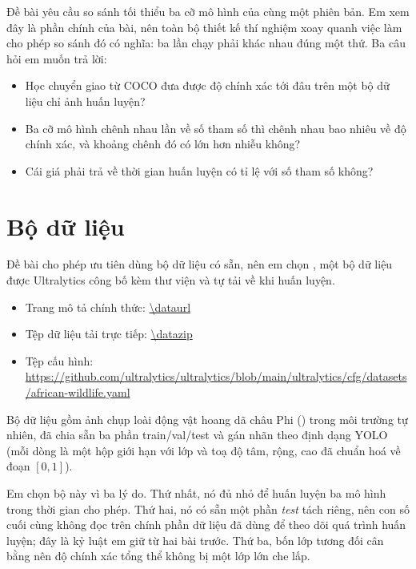 \documentclass[11pt,a4paper]{article}
\begin{document}
Đề bài yêu cầu so sánh tối thiểu ba cỡ mô hình của cùng một phiên bản. Em xem đây là phần chính
của bài, nên toàn bộ thiết kế thí nghiệm xoay quanh việc làm cho phép so sánh đó có nghĩa: ba lần
chạy phải khác nhau đúng một thứ. Ba câu hỏi em muốn trả lời:

\begin{itemize}
  \item Học chuyển giao từ COCO đưa được độ chính xác tới đâu trên một bộ dữ liệu chỉ
        \ntrain{} ảnh huấn luyện?
  \item Ba cỡ mô hình chênh nhau \paramratio{} lần về số tham số thì chênh nhau bao nhiêu về độ
        chính xác, và khoảng chênh đó có lớn hơn nhiễu không?
  \item Cái giá phải trả về thời gian huấn luyện có tỉ lệ với số tham số không?
\end{itemize}

\section{Bộ dữ liệu}

Đề bài cho phép ưu tiên dùng bộ dữ liệu có sẵn, nên em chọn \textbf{\dataname{}}, một bộ dữ liệu
được Ultralytics công bố kèm thư viện và tự tải về khi huấn luyện.

\begin{itemize}
  \item Trang mô tả chính thức: \url{\dataurl}
  \item Tệp dữ liệu tải trực tiếp: \url{\datazip}
  \item Tệp cấu hình: \url{https://github.com/ultralytics/ultralytics/blob/main/ultralytics/cfg/datasets/african-wildlife.yaml}
\end{itemize}

Bộ dữ liệu gồm ảnh chụp \nclasses{} loài động vật hoang dã châu Phi (\classlist{}) trong môi
trường tự nhiên, đã chia sẵn ba phần train/val/test và gán nhãn theo định dạng YOLO (mỗi dòng là
một hộp giới hạn với lớp và toạ độ tâm, rộng, cao đã chuẩn hoá về đoạn $[0,1]$).

Em chọn bộ này vì ba lý do. Thứ nhất, nó đủ nhỏ để huấn luyện ba mô hình trong thời gian cho phép.
Thứ hai, nó có sẵn một phần \emph{test} tách riêng, nên con số cuối cùng không đọc trên chính phần
dữ liệu đã dùng để theo dõi quá trình huấn luyện; đây là kỷ luật em giữ từ hai bài trước. Thứ
ba, bốn lớp tương đối cân bằng nên độ chính xác tổng thể không bị một lớp lớn che lấp.



\end{document}
